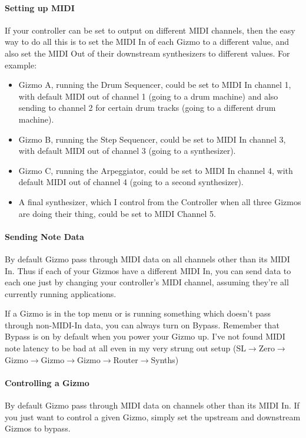 \documentclass{article}
\begin{document}
\paragraph{Setting up MIDI} If your controller can be set to output on different MIDI channels, then the easy way to do all this is to set the MIDI In of each Gizmo to a different value, and also set the MIDI Out of their downstream synthesizers to different values.  For example:

\begin{itemize}
\item Gizmo A, running the Drum Sequencer, could be set to MIDI In channel 1, with default MIDI out of channel 1 (going to a drum machine) and also sending to channel 2 for certain drum tracks (going to a different drum machine).  
\item Gizmo B, running the Step Sequencer, could be set to MIDI In channel 3, with default MIDI out of channel 3 (going to a synthesizer).
\item Gizmo C, running the Arpeggiator, could be set to MIDI In channel 4, with default MIDI out of channel 4 (going to a second synthesizer).
\item A final synthesizer, which I control from the Controller when all three Gizmos are doing their thing, could be set to MIDI Channel 5.
\end{itemize}

\paragraph{Sending Note Data} By default Gizmo pass through MIDI data on all channels other than its MIDI In.  Thus if each of your Gizmos have a different MIDI In, you can send data to each one just by changing your controller's MIDI channel, assuming they're all currently running applications.

If a Gizmo is in the top menu or is running something which doesn't pass through non-MIDI-In data, you can always turn on Bypass.  Remember that Bypass is on by default when you power your Gizmo up.  I've not found MIDI note latency to be bad at all even in my very strung out setup (SL\(\rightarrow\)Zero\(\rightarrow\)Gizmo\(\rightarrow\)Gizmo\(\rightarrow\)Gizmo\(\rightarrow\)Router\(\rightarrow\)Synths)

\paragraph{Controlling a Gizmo} By default Gizmo pass through MIDI data on channels other than its MIDI In.  If you just want to control a given Gizmo, simply set the upstream and downstream Gizmos to bypass.  
\end{document}
